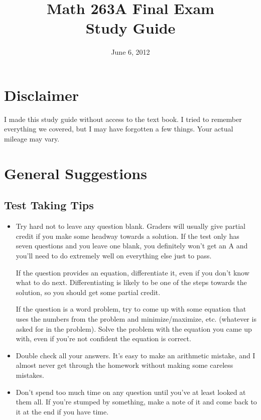 \documentclass[fleqn]{article}
\title{Math 263A Final Exam\\ Study Guide}
\date{June 6, 2012}
\author{}
\begin{document}
\maketitle  


\tableofcontents

\section{Disclaimer}

I made this study guide without access to the text book.  I tried to remember everything we covered, but I may
have forgotten a few things.  Your actual mileage may vary.

\section{General Suggestions}

\subsection{Test Taking Tips}
\begin{itemize}
\item Try hard not to leave any question blank.  Graders will usually give partial credit if you make some headway
  towards a solution.  If the test only has seven questions and you leave one blank, you definitely won't get an A and
  you'll need to do extremely well on everything else just to pass.

  If the question provides an equation, differentiate it, even if you don't know what to do next.  Differentiating is
  likely to be one of the steps towards the solution, so you should get some partial credit.

  If the question is a word problem, try to come up with some equation that uses the numbers from the problem and
  minimize/maximize, etc. (whatever is asked for in the problem).  Solve the problem with the equation you came up with,
  even if you're not confident the equation is correct.

\item Double check all your answers.  It's easy to make an arithmetic mistake, and I almost never get through the
  homework without making some careless mistakes.

\item Don't spend too much time on any question until you've at least looked at them all.  If you're stumped by
  something, make a note of it and come back to it at the end if you have time.


\end{itemize}
\end{document}
